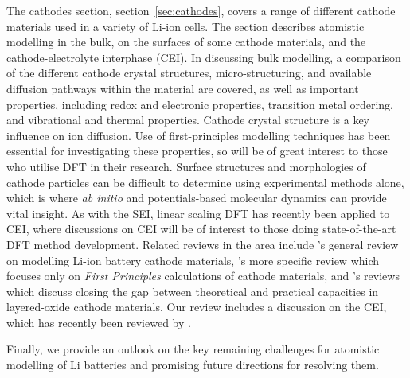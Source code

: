 \documentclass[../main.tex]{subfiles}
\begin{document}
The cathodes section, section~\ref{sec:cathodes}, covers a range of different cathode materials used in a variety of Li-ion cells. The section describes atomistic modelling in the bulk, on the surfaces of some cathode materials, and the cathode-electrolyte interphase (CEI). In discussing bulk modelling, a comparison of the different cathode crystal structures, micro-structuring, and available diffusion pathways within the material are covered, as well as important properties, including redox and electronic properties, transition metal ordering, and vibrational and thermal properties. Cathode crystal structure is a key influence on ion diffusion. Use of first-principles modelling techniques has been essential for investigating these properties, so will be of great interest to those who utilise DFT in their research. Surface structures and morphologies of cathode particles can be difficult to determine using experimental methods alone, which is where \textit{ab initio} and potentials-based molecular dynamics can provide vital insight. As with the SEI, linear scaling DFT has recently been applied to CEI, where discussions on CEI will be of interest to those doing state-of-the-art DFT method development. Related reviews in the area include \citeauthor{ma2018computer}'s \cite{ma2018computer} general review on modelling Li-ion battery cathode materials, \citeauthor{yan2014review}'s \cite{yan2014review} more specific review which focuses only on \textit{First Principles} calculations of cathode materials, and \citeauthor{wang2018reviving}'s \cite{wang2018reviving} reviews which discuss closing the gap between theoretical and practical capacities in layered-oxide cathode materials. Our review includes a discussion on the CEI, which has recently been reviewed by \citeauthor{maleki2019controllable} \cite{maleki2019controllable}.

Finally, we provide an outlook on the key remaining challenges for atomistic modelling of Li batteries and promising future directions for resolving them.
\end{document}
